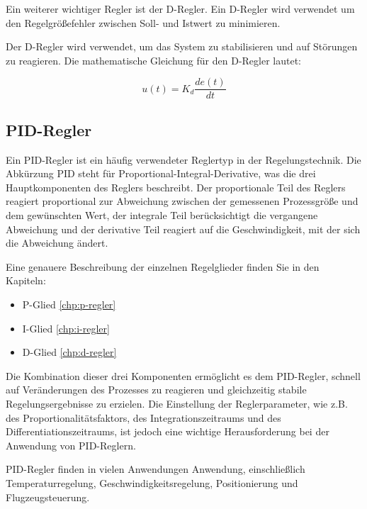     Ein weiterer wichtiger Regler ist der \ac{D-Regler}. Ein \ac{D-Regler} wird verwendet um den Regelgrößefehler zwischen Soll- und Istwert zu minimieren.

    Der \ac{D-Regler} wird verwendet, um das System zu stabilisieren und auf Störungen zu reagieren. Die mathematische Gleichung für den D-Regler lautet:

    \begin{figure}[H]
        \begin{equation*}
            u(t) = K_d \frac{de(t)}{dt}
        \end{equation*}
    \end{figure}


    \subsection{PID-Regler} \label{chp:pid}
    Ein PID-Regler ist ein häufig verwendeter Reglertyp in der Regelungstechnik. Die Abkürzung PID steht für Proportional-Integral-Derivative, was die drei Hauptkomponenten des Reglers beschreibt. Der proportionale Teil des Reglers reagiert proportional zur Abweichung zwischen der gemessenen Prozessgröße und dem gewünschten Wert, der integrale Teil berücksichtigt die vergangene Abweichung und der derivative Teil reagiert auf die Geschwindigkeit, mit der sich die Abweichung ändert.

    Eine genauere Beschreibung der einzelnen Regelglieder finden Sie in den Kapiteln: 
    \begin{itemize}
        \item{P-Glied \ref{chp:p-regler}}
        \item{I-Glied \ref{chp:i-regler}}
        \item{D-Glied \ref{chp:d-regler}}
    \end{itemize}


Die Kombination dieser drei Komponenten ermöglicht es dem PID-Regler, schnell auf Veränderungen des Prozesses zu reagieren und gleichzeitig stabile Regelungsergebnisse zu erzielen. Die Einstellung der Reglerparameter, wie z.B. des Proportionalitätsfaktors, des Integrationszeitraums und des Differentiationszeitraums, ist jedoch eine wichtige Herausforderung bei der Anwendung von PID-Reglern.

PID-Regler finden in vielen Anwendungen Anwendung, einschließlich Temperaturregelung, Geschwindigkeitsregelung, Positionierung und Flugzeugsteuerung.
\cite[vgl. ][Kapitel 11.3]{SWB-165930377X}


